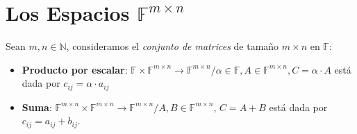 \documentclass[11pt,a4paper]{article}
\begin{document}
\section{Los Espacios $\mathbb{F}^{m \times n}$}
Sean $m,n \in \mathbb{N}$, consideramos el \textit{conjunto de matrices} de tamaño $m \times n$ en $\mathbb{F}$:
\begin{itemize}
\itemsep-0.3em
\item \textbf{Producto por escalar}: $\mathbb{F} \times \mathbb{F}^{m \times n} \rightarrow \mathbb{F}^{m \times n} / \alpha \in \mathbb{F}, A \in \mathbb{F}^{m \times n}, C = \alpha \cdot A$ est\'a dada por $c_{ij} = \alpha \cdot a_{ij}$
\item \textbf{Suma}: $\mathbb{F}^{m \times n} \times \mathbb{F}^{m \times n} \rightarrow \mathbb{F}^{m \times n} / A,B \in \mathbb{F}^{m \times n}$, $C = A + B$ est\'a dada por $c_{ij} = a_{ij} + b_{ij}$.
\end{itemize}
\end{document}
